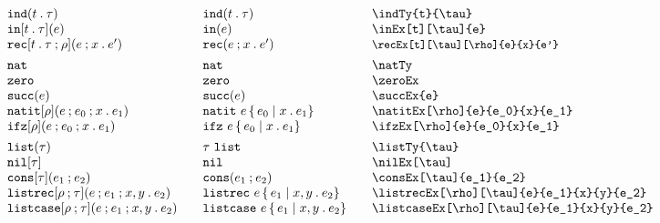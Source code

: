 \documentclass[11pt]{article}
\begin{document}
\begin{figure}
  
  \begin{small}
    \begin{displaymath}
      \begin{array}{l@{\qquad}l@{\qquad}l@{\qquad}l}
        \indTy{t}{\tau}                            & \indTy*{t}{\tau}                & \verb|\indTy{t}{\tau}|                            \\
        \inEx[t][\tau]{e}                          & \inEx*{e}                       & \verb|\inEx[t][\tau]{e}|                          \\
        \recEx[t][\tau][\rho]{e}{x}{e'}            & \recEx*{e}{x}{e'}               & \small{\verb|\recEx[t][\tau][\rho]{e}{x}{e'}|}    \\[1ex]
  
        \natTy                                   & \natTy*                       & \verb|\natTy|                                   \\
        \zeroEx                                    & \zeroEx*                        & \verb|\zeroEx|                                    \\
        \succEx{e}                                 & \succEx*{e}                     & \verb|\succEx{e}|                                 \\
        \natitEx[\rho]{e}{e_0}{x}{e_1}             & \natitEx*{e}{e_0}{x}{e_1}       & \verb|\natitEx[\rho]{e}{e_0}{x}{e_1}|             \\
        \ifzEx[\rho]{e}{e_0}{x}{e_1}               & \ifzEx*{e}{e_0}{x}{e_1}         & \verb|\ifzEx[\rho]{e}{e_0}{x}{e_1}|               \\[1ex]
  
        \listTy{\tau}                              & \listTy*{\tau}                  & \verb|\listTy{\tau}|                              \\
        \nilEx[\tau]                               & \nilEx*                       & \verb|\nilEx[\tau]|                               \\
        \consEx[\tau]{e_1}{e_2}                    & \consEx*{e_1}{e_2}              & \verb|\consEx[\tau]{e_1}{e_2}|                    \\
        \listrecEx[\rho][\tau]{e}{e_1}{x}{y}{e_2}  & \listrecEx*{e}{e_1}{x}{y}{e_2}  & \verb|\listrecEx[\rho][\tau]{e}{e_1}{x}{y}{e_2}|  \\
        \listcaseEx[\rho][\tau]{e}{e_1}{x}{y}{e_2} & \listcaseEx*{e}{e_1}{x}{y}{e_2} & \verb|\listcaseEx[\rho][\tau]{e}{e_1}{x}{y}{e_2}| \\[1ex]
  

\end{array}
\end{displaymath}
\end{small}
\end{figure}
\end{document}
